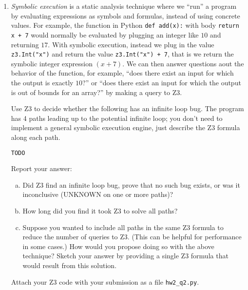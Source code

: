 \documentclass{article}
\begin{document}
\begin{enumerate}
\item
\emph{Symbolic execution} is a static analysis technique where we ``run'' a program by evaluating expressions as symbols and formulas,
instead of using concrete values.
For example, the function in Python \texttt{def add(x):} with body \texttt{return x + 7} would normally be evaluated
by plugging an integer like $10$ and returning $17$. With symbolic execution, instead we plug in the value
\texttt{z3.Int("x")} and return the value \texttt{z3.Int("x") + 7}, that is we return the symbolic integer expression $(x + 7)$. We can then answer questions aout the behavior of the function, for example, ``does there exist an input for which the output is exactly $10$?'' or ``does there exist an input for which the output is out of bounds for an array?'' by making a query to Z3.

Use Z3 to decide whether the following has an infinite loop bug.
The program has 4 paths leading up to the potential infinite loop; you don't need to implement a general symbolic execution engine, just describe the Z3 formula along each path.

\begin{verbatim}
TODO
\end{verbatim}

Report your answer:

\begin{enumerate}[(a)]
\item Did Z3 find an infinite loop bug, prove that no such bug exists, or was it inconclusive (UNKNOWN on one or more paths)?
\item How long did you find it took Z3 to solve all paths?
\item Suppose you wanted to include all paths in the same Z3 formula to reduce the number of queries to Z3.
(This can be helpful for performance in some cases.) How would you propose doing so with the above technique?
Sketch your answer by providing a single Z3 formula that would result from this solution.
\end{enumerate}

Attach your Z3 code with your submission as a file \texttt{hw2\_q2.py}.

\end{enumerate}
\end{document}
